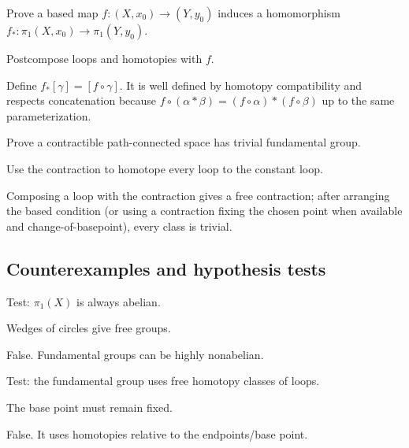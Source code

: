 \begin{exercise}[Functoriality]\label{exr:viii09-ped-08}
Prove a based map $f:(X,x_0)\to(Y,y_0)$ induces a homomorphism $f_*:\pi_1(X,x_0)\to\pi_1(Y,y_0)$.
\end{exercise}
\begin{hint}
Postcompose loops and homotopies with $f$.
\end{hint}
\begin{solution}
Define $f_*[\gamma]=[f\circ\gamma]$. It is well defined by homotopy compatibility and respects concatenation because $f\circ(\alpha*\beta)=(f\circ\alpha)*(f\circ\beta)$ up to the same parameterization.
\end{solution}

\begin{exercise}\label{exr:viii09-ped-09}
Prove a contractible path-connected space has trivial fundamental group.
\end{exercise}
\begin{hint}
Use the contraction to homotope every loop to the constant loop.
\end{hint}
\begin{solution}
Composing a loop with the contraction gives a free contraction; after arranging the based condition (or using a contraction fixing the chosen point when available and change-of-basepoint), every class is trivial.
\end{solution}

\subsection*{Counterexamples and hypothesis tests}

\begin{exercise}\label{exr:viii09-ped-10}
Test: $\pi_1(X)$ is always abelian.
\end{exercise}
\begin{hint}
Wedges of circles give free groups.
\end{hint}
\begin{solution}
False.  Fundamental groups can be highly nonabelian.
\end{solution}

\begin{exercise}\label{exr:viii09-ped-11}
Test: the fundamental group uses free homotopy classes of loops.
\end{exercise}
\begin{hint}
The base point must remain fixed.
\end{hint}
\begin{solution}
False. It uses homotopies relative to the endpoints/base point.
\end{solution}

